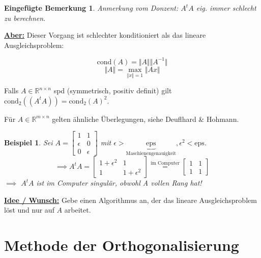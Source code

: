 \documentclass{book}
\newtheorem*{mremark}{Eingefügte Bemerkung}
\newtheorem{example}[algorithm]{Beispiel}
\def\R{\mathbb{R}}
\def\cond{\text{cond}}
\def\eps{\text{eps}}
\begin{document}
        \begin{mremark}
            Anmerkung vom Donzent: $A^tA$ eig. immer schlecht zu berechnen.
        \end{mremark}


        \underline{\textbf{Aber:}} Dieser Vorgang ist schlechter konditioniert als das lineare Ausgleichsproblem: 
        
        \begin{tcolorbox}[enhanced,breakable,
            title=Eingeschobene Definition / Wiederholung]
            \[
                \cond(A)=\Vert A \Vert \Vert A^{-1} \Vert
            \]
            \[
                \Vert A \Vert =\max_{\Vert x \Vert=1} \Vert Ax \Vert
            \]
        \end{tcolorbox}

        Falls $A\in\R^{n\times n}$ spd (symmetrisch, positiv definit) gilt $\cond_2((A^tA))=\cond_2(A)^2$. 

        Für $A\in\R^{m\times n}$ gelten ähnliche Überlegungen, siehe Deuflhard \& Hohmann.

        \begin{example}\label{b2.7}
            Sei $A=\begin{bmatrix}
                1 & 1\\\epsilon&0\\0 & \epsilon
            \end{bmatrix}$ mit $\epsilon>\underbrace{\eps}_{\text{Maschienengenauigkeit}},\epsilon^2<\eps$.
            \[\implies A^tA=\begin{bmatrix}
                1 +\epsilon^2 & 1\\
                1 & 1+\epsilon^2
            \end{bmatrix}\stackrel{\text{im Computer}}{=}\begin{bmatrix}
                1 & 1\\
                1 & 1
            \end{bmatrix}\]
            $\implies$ $A^tA$ ist im Computer singulär, obwohl A vollen Rang hat!
        \end{example}

        \underline{\textbf{Idee / Wunsch:}} Gebe einen Algorithmus an, der das lineare Ausgleichsproblem löst und nur 
        auf $A$ arbeitet.

    \section{Methode der Orthogonalisierung}
\end{document}
